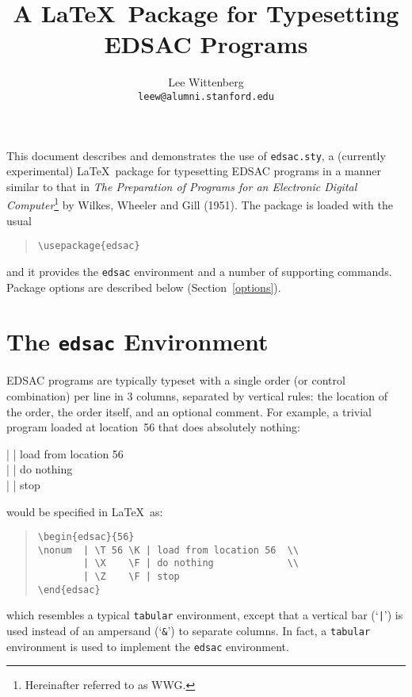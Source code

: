 \documentclass[letterpaper,11pt]{article}
\title{A \LaTeX\ Package for Typesetting EDSAC Programs}
\author{Lee Wittenberg\\\texttt{leew@alumni.stanford.edu}}
\begin{document}
\maketitle

\noindent
This document describes and demonstrates the use of \texttt{edsac.sty}, a
(currently experimental) \LaTeX\ package for typesetting EDSAC
programs in a manner similar to that in \emph{The Preparation of
Programs for an Electronic Digital Computer}\footnote{Hereinafter
referred to as WWG.} by Wilkes, Wheeler and
Gill (1951).  The package is loaded with the usual
\begin{quote}
    \verb"\usepackage{edsac}"
\end{quote}
and it provides the
\texttt{edsac} environment and a number of supporting commands.
Package options are described below (Section~\ref{options}).

\section{The \texttt{edsac} Environment}

EDSAC programs are typically typeset with a single order (or control
combination) per line in 3 columns, separated by vertical rules:
the location of the order, the order itself, and an optional comment.
For example, a trivial program loaded at location~56 that does
absolutely nothing:
\begin{edsac}{56}
\nonum  |  \K | load from location 56  \\
        | \X    \F | do nothing             \\
        | \Z    \F | stop
\end{edsac}
would be specified in \LaTeX\ as:
\begin{quote}\small
\begin{verbatim}
\begin{edsac}{56}
\nonum  | \T 56 \K | load from location 56  \\
        | \X    \F | do nothing             \\
        | \Z    \F | stop
\end{edsac}
\end{verbatim}
\end{quote}
which resembles a typical \texttt{tabular} environment, except that a
vertical bar (`\verb"|"') is used instead of an ampersand (`\verb"&"')
to separate columns.  In fact, a \texttt{tabular} environment is used
to implement the \texttt{edsac} environment.
\end{document}
